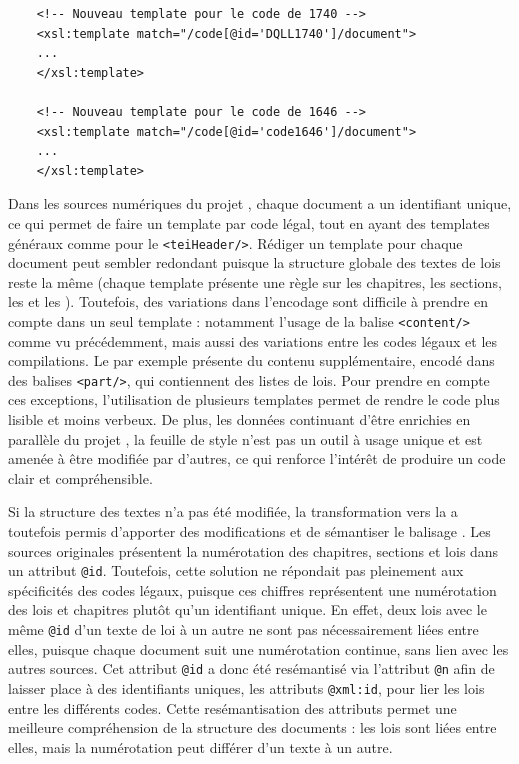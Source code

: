 \begin{verbatim}
    <!-- Nouveau template pour le code de 1740 -->
    <xsl:template match="/code[@id='DQLL1740']/document">
    ...
    </xsl:template>

    <!-- Nouveau template pour le code de 1646 -->
    <xsl:template match="/code[@id='code1646']/document">
    ...
    </xsl:template>
\end{verbatim}
Dans les sources numériques du projet \LSC, chaque document a un identifiant unique, ce qui permet de faire un template par code légal, tout en ayant des templates généraux comme pour le \texttt{<teiHeader/>}. Rédiger un template pour chaque document peut sembler redondant puisque la structure globale des textes de lois reste la même (chaque template présente une règle sur les chapitres, les sections, les \lu et les \li). Toutefois, des variations dans l'encodage sont difficile à prendre en compte dans un seul template : notamment l'usage de la balise \texttt{<content/>} comme vu précédemment, mais aussi des variations entre les codes légaux et les compilations. Le \huidian par exemple présente du contenu supplémentaire, encodé dans des balises \texttt{<part/>}, qui contiennent des listes de lois. Pour prendre en compte ces exceptions, l'utilisation de plusieurs templates permet de rendre le code plus lisible et moins verbeux. De plus, les données \LSC continuant d'être enrichies en parallèle du projet \COREL, la feuille de style n'est pas un outil à usage unique et est amenée à être modifiée par d'autres, ce qui renforce l'intérêt de produire un code clair et compréhensible. 

Si la structure des textes n'a pas été modifiée, la transformation vers la \TEI a toutefois permis d'apporter des modifications et de sémantiser le balisage \XML. Les sources originales présentent la numérotation des chapitres, sections et lois dans un attribut \texttt{@id}. Toutefois, cette solution ne répondait pas pleinement aux spécificités des codes légaux, puisque ces chiffres représentent une numérotation des lois et chapitres plutôt qu'un identifiant unique. En effet, deux lois avec le même \texttt{@id} d'un texte de loi à un autre ne sont pas nécessairement liées entre elles, puisque chaque document suit une numérotation continue, sans lien avec les autres sources. Cet attribut \texttt{@id} a donc été resémantisé via l'attribut \texttt{@n} afin de laisser place à des identifiants uniques, les attributs \texttt{@xml:id}, pour lier les lois entre les différents codes. Cette resémantisation des attributs permet une meilleure compréhension de la structure des documents : les lois sont liées entre elles, mais la numérotation peut différer d'un texte à un autre.

